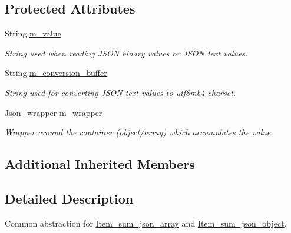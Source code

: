 \subsection*{Protected Attributes}
\begin{DoxyCompactItemize}
\item 
\mbox{\label{classItem__sum__json_a577a5dd188f57b67eb970f05610e0efe}} 
String \mbox{\hyperlink{classItem__sum__json_a577a5dd188f57b67eb970f05610e0efe}{m\+\_\+value}}
\begin{DoxyCompactList}\small\item\em String used when reading J\+S\+ON binary values or J\+S\+ON text values. \end{DoxyCompactList}\item 
\mbox{\label{classItem__sum__json_a57cf67a9411221ea202dc507907cd3be}} 
String \mbox{\hyperlink{classItem__sum__json_a57cf67a9411221ea202dc507907cd3be}{m\+\_\+conversion\+\_\+buffer}}
\begin{DoxyCompactList}\small\item\em String used for converting J\+S\+ON text values to utf8mb4 charset. \end{DoxyCompactList}\item 
\mbox{\label{classItem__sum__json_a9846e4ac287791f55c0a18255be79872}} 
\mbox{\hyperlink{classJson__wrapper}{Json\+\_\+wrapper}} \mbox{\hyperlink{classItem__sum__json_a9846e4ac287791f55c0a18255be79872}{m\+\_\+wrapper}}
\begin{DoxyCompactList}\small\item\em Wrapper around the container (object/array) which accumulates the value. \end{DoxyCompactList}\end{DoxyCompactItemize}
\subsection*{Additional Inherited Members}


\subsection{Detailed Description}
Common abstraction for \mbox{\hyperlink{classItem__sum__json__array}{Item\+\_\+sum\+\_\+json\+\_\+array}} and \mbox{\hyperlink{classItem__sum__json__object}{Item\+\_\+sum\+\_\+json\+\_\+object}}. 

